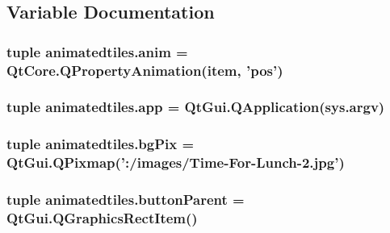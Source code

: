 \subsection{Variable Documentation}
\hypertarget{namespaceanimatedtiles_aa99b96cc33dd4ed567e82da6967255c8}{}
\subsubsection[{anim}]{\setlength{\rightskip}{0pt plus 5cm}tuple animatedtiles.\+anim = Qt\+Core.\+Q\+Property\+Animation({\bf item}, 'pos')}\label{namespaceanimatedtiles_aa99b96cc33dd4ed567e82da6967255c8}
\hypertarget{namespaceanimatedtiles_a7d7f82317a4c306c58e1ea877a49be3a}{}
\subsubsection[{app}]{\setlength{\rightskip}{0pt plus 5cm}tuple animatedtiles.\+app = Qt\+Gui.\+Q\+Application(sys.\+argv)}\label{namespaceanimatedtiles_a7d7f82317a4c306c58e1ea877a49be3a}
\hypertarget{namespaceanimatedtiles_a00862f57ff9083ab1bba3be8f457fbb0}{}
\subsubsection[{bg\+Pix}]{\setlength{\rightskip}{0pt plus 5cm}tuple animatedtiles.\+bg\+Pix = Qt\+Gui.\+Q\+Pixmap('\+:/images/Time-\/For-\/Lunch-\/2.jpg')}\label{namespaceanimatedtiles_a00862f57ff9083ab1bba3be8f457fbb0}
\hypertarget{namespaceanimatedtiles_aa63235906027ecca5b15b81876f430a5}{}
\subsubsection[{button\+Parent}]{\setlength{\rightskip}{0pt plus 5cm}tuple animatedtiles.\+button\+Parent = Qt\+Gui.\+Q\+Graphics\+Rect\+Item()}\label{namespaceanimatedtiles_aa63235906027ecca5b15b81876f430a5}
\hypertarget{namespaceanimatedtiles_ad5df798c7a5a8010105ea14f490b0ecb}{}
